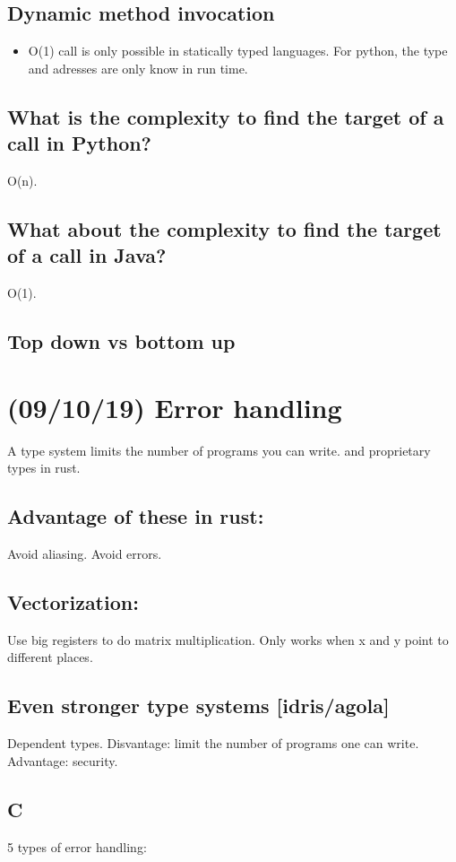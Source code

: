 \documentclass[11pt]{article}
\begin{document}
\subsection{Dynamic method invocation}
\label{sec:org56a9a13}
\begin{itemize}
\item O(1) call is only possible in statically typed languages. For python, the type and
adresses are only know in run time.
\end{itemize}
\subsection{What is the complexity to find the target of a call in Python?}
\label{sec:orga512c58}
O(n).
\subsection{What about the complexity to find the target of a call in Java?}
\label{sec:org7b315d9}
O(1).
\subsection{Top down vs bottom up}
\label{sec:org4b88cd4}
\section{(09/10/19) Error handling}
\label{sec:org00598ae}
A type system limits the number of programs you can write. and
proprietary types in rust.
\subsection{Advantage of these in rust:}
\label{sec:orgaadb527}
Avoid aliasing. Avoid errors.
\subsection{Vectorization:}
\label{sec:orga5b0320}
Use big registers to do matrix multiplication. Only works when x and y point to
different places.
\subsection{Even stronger type systems [idris/agola]}
\label{sec:org577368e}
Dependent types. Disvantage: limit the number of programs one can write. Advantage:
security.
\subsection{C}
\label{sec:orga802b29}
5 types of error handling:
\end{document}
